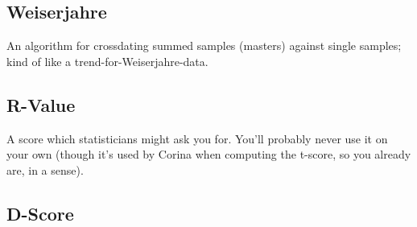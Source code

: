\subsection{Weiserjahre}
	

An algorithm for crossdating summed samples (masters) against single samples; kind of like a trend-for-Weiserjahre-data.

\subsection{R-Value}
	

A score which statisticians might ask you for. You'll probably never use it on your own (though it's used by Corina when computing the t-score, so you already are, in a sense).

 
\subsection{D-Score }